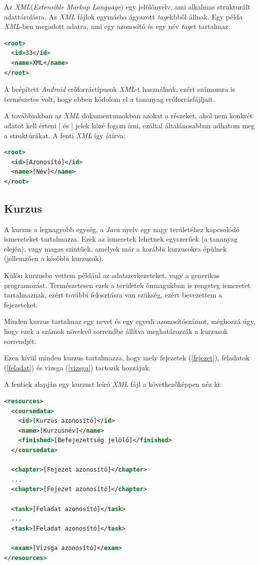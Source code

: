 \documentclass[12pt,a4paper]{article}
\newcommand{\xml}{\textit{XML}\xspace}
\begin{document}
	Az \xml (\textit{Extensible Markup Language}) egy jelölőnyelv, ami alkalmas strukturált adattárolásra. Az \xml fájlok egymásba ágyazott \textit{tag}ekbből állnak. Egy példa \xml-ben megadott adatra, ami egy azonosító és egy név \textit{tag}et tartalmaz:
	
	\bigskip
	\begin{lstlisting}[language=XML]
<root>
  <id>33</id>
  <name>XML</name>
</root>
	\end{lstlisting}
	\bigskip
	
	A beépített \textit{Android} erőforrástípusok \xml-t használnak, ezért számomra is természetes volt, hogy ebben kódolom el a tananyag erőforrásfájljait.
	
	A továbbiakban az \xml dokumentumokban azokat a részeket, ahol nem konkrét adatot kell érteni [ és ] jelek közé fogom írni, ezáltal általánosabban adhatom meg a struktúrákat. A fenti \xml így átírva:
	
	\bigskip
	\begin{lstlisting}[language=XML]
<root>
  <id>[Azonosító]</id>
  <name>[Név]</name>
</root>
	\end{lstlisting}
	
	\subsection{Kurzus}
	\bigskip
	
	A kurzus a legnagyobb egység, a \textit{Java} nyelv egy nagy területéhez kapcsolódó ismereteket tartalmazza. Ezek az ismeretek lehetnek egyszerűek (a tananyag elején), vagy magas szintűek, amelyek már a korábbi kurzusokra épülnek (jellemzően a későbbi kurzusok).
	
	Külön kurzusba vettem például az adatszerkezeteket, vagy a generikus programozást. Természetesen ezek a területek önmagukban is rengeteg ismeretet tartalmaznak, ezért további felosztásra van szükség, ezért bevezettem a fejezeteket.
	
	Minden kurzus tartalmaz egy nevet és egy egyedi azonosítószámot, méghozzá úgy, hogy ezek a számok növekvő sorrendbe állítva meghatározzák a kurzusok sorrendjét.
	
	Ezen kívül minden kurzus tartalmazza, hogy mely fejezetek (\ref{fejezet}), feladatok (\ref{feladat}) és vizsga (\ref{vizsga}) tartozik hozzájuk.
	
	A fentiek alapján egy kurzust leíró \xml fájl a következőképpen néz ki:
	
	\bigskip
	\begin{lstlisting}[language=XML]
<resources>
  <coursedata>
    <id>[Kurzus azonosító]</id>
    <name>[Kurzusnév]</name>
    <finished>[Befejezettség jelölő]</finished>
  </coursedata>
  
  <chapter>[Fejezet azonosító]</chapter>
  ...
  <chapter>[Fejezet azonosító]</chapter>
  
  <task>[Feladat azonosító]</task>
  ...
  <task>[Feladat azonosító]</task>
  
  <exam>[Vizsga azonosító]</exam>
</resources>
	\end{lstlisting}
	\bigskip
	
\end{document}
